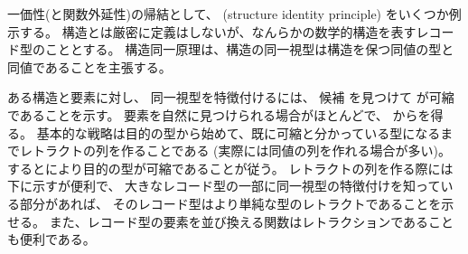 \documentclass[index]{subfiles}
\begin{document}

一価性(と関数外延性)の帰結として、
(structure identity principle)
をいくつか例示する。
構造とは厳密に定義はしないが、なんらかの数学的構造を表すレコード型のこととする。
構造同一原理は、構造の同一視型は構造を保つ同値の型と同値であることを主張する。

ある構造と要素に対し、
同一視型を特徴付けるには、
候補
を見つけて
が可縮であることを示す。
要素を自然に見つけられる場合がほとんどで、
からを得る。
基本的な戦略は目的の型から始めて、既に可縮と分かっている型になるまでレトラクトの列を作ることである
(実際には同値の列を作れる場合が多い)。
するとにより目的の型が可縮であることが従う。
レトラクトの列を作る際には下に示すが便利で、
大きなレコード型の一部に同一視型の特徴付けを知っている部分があれば、
そのレコード型はより単純な型のレトラクトであることを示せる。
また、レコード型の要素を並び換える関数はレトラクションであることも便利である。





\end{document}

